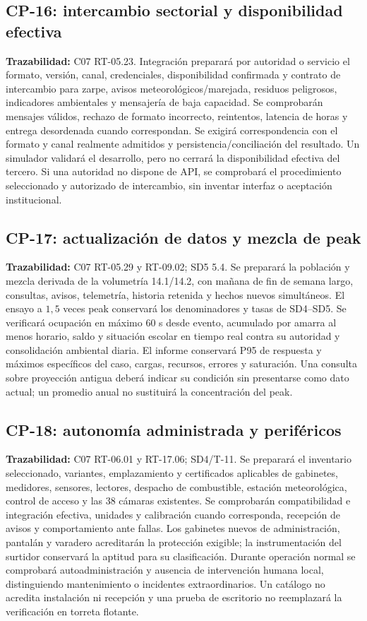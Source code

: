 \subsection{CP-16: intercambio sectorial y disponibilidad efectiva}
\label{caso:cp-16}
\textbf{Trazabilidad:} C07 RT-05.23. Integración preparará por autoridad o servicio el formato, versión, canal, credenciales, disponibilidad confirmada y contrato de intercambio para zarpe, avisos meteorológicos/marejada, residuos peligrosos, indicadores ambientales y mensajería de baja capacidad. Se comprobarán mensajes válidos, rechazo de formato incorrecto, reintentos, latencia de horas y entrega desordenada cuando correspondan. Se exigirá correspondencia con el formato y canal realmente admitidos y persistencia/conciliación del resultado. Un simulador validará el desarrollo, pero no cerrará la disponibilidad efectiva del tercero. Si una autoridad no dispone de API, se comprobará el procedimiento seleccionado y autorizado de intercambio, sin inventar interfaz o aceptación institucional.

\subsection{CP-17: actualización de datos y mezcla de peak}
\label{caso:cp-17}
\textbf{Trazabilidad:} C07 RT-05.29 y RT-09.02; SD5 5.4. Se preparará la población y mezcla derivada de la volumetría 14.1/14.2, con mañana de fin de semana largo, consultas, avisos, telemetría, historia retenida y hechos nuevos simultáneos. El ensayo a $1,5$ veces peak conservará los denominadores y tasas de SD4--SD5. Se verificará ocupación en máximo 60 s desde evento, acumulado por amarra al menos horario, saldo y situación escolar en tiempo real contra su autoridad y consolidación ambiental diaria. El informe conservará P95 de respuesta y máximos específicos del caso, cargas, recursos, errores y saturación. Una consulta sobre proyección antigua deberá indicar su condición sin presentarse como dato actual; un promedio anual no sustituirá la concentración del peak.

\subsection{CP-18: autonomía administrada y periféricos}
\label{caso:cp-18}
\textbf{Trazabilidad:} C07 RT-06.01 y RT-17.06; SD4/T-11. Se preparará el inventario seleccionado, variantes, emplazamiento y certificados aplicables de gabinetes, medidores, sensores, lectores, despacho de combustible, estación meteorológica, control de acceso y las 38 cámaras existentes. Se comprobarán compatibilidad e integración efectiva, unidades y calibración cuando corresponda, recepción de avisos y comportamiento ante fallas. Los gabinetes nuevos de administración, pantalán y varadero acreditarán la protección exigible; la instrumentación del surtidor conservará la aptitud para su clasificación. Durante operación normal se comprobará autoadministración y ausencia de intervención humana local, distinguiendo mantenimiento o incidentes extraordinarios. Un catálogo no acredita instalación ni recepción y una prueba de escritorio no reemplazará la verificación en torreta flotante.

